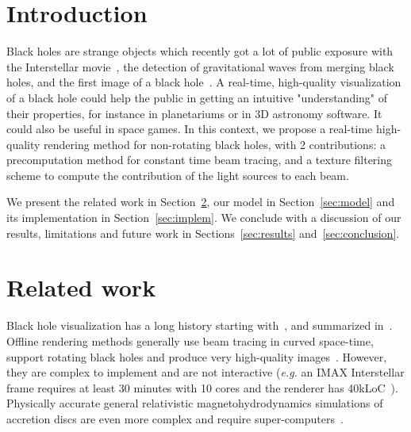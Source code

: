 \documentclass{document}
\begin{document}
\section{Introduction}

Black holes are strange objects which recently got a lot of  public exposure 
with the Interstellar movie~\cite{James2015}, the detection of gravitational 
waves from merging black holes\cite{GRWave2016}, and the first image of a black 
hole~\cite{EHT2019}. A real-time, high-quality visualization of a black hole 
could help the public in getting an intuitive "understanding" of their 
properties, for instance in planetariums or in 3D astronomy software. It could 
also be useful in space games. In this context, we propose a real-time 
high-quality rendering method for non-rotating black holes, with 2 
contributions: a precomputation method for constant time beam tracing, and a 
texture filtering scheme to compute the contribution of the light sources to 
each beam.

We present the related work in Section~\ref{sec:relatedwork}, our model in 
Section~\ref{sec:model} and its implementation in Section~\ref{sec:implem}. We 
conclude with a discussion of our results, limitations and future work in 
Sections~\ref{sec:results} and~\ref{sec:conclusion}.

\section{Related work}\label{sec:relatedwork}

Black hole visualization has a long history starting with~\cite{Luminet1979}, 
and summarized in~\cite{Luminet2019}. Offline rendering methods generally use  
beam tracing in curved space-time, support rotating black holes and produce 
very high-quality images~\cite{Hamilton2014,Riazuelo2014,James2015}. However, 
they are complex to implement and are not interactive ({\em e.g.} an IMAX 
Interstellar frame requires at least 30 minutes with 10 cores and the renderer 
has 40kLoC~\cite{James2015}). Physically accurate general relativistic 
magnetohydrodynamics simulations of accretion discs are even more complex and 
require super-computers~\cite{MNRAS2018}.
\end{document}
